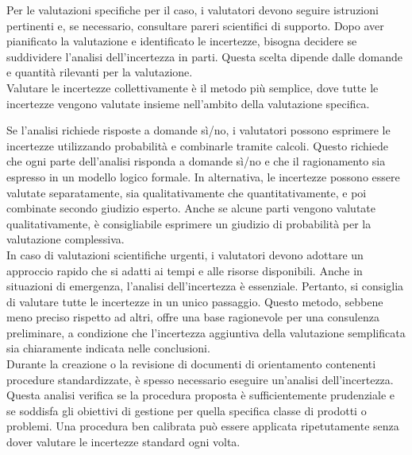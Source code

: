 
Per le valutazioni specifiche per il caso, i valutatori devono seguire istruzioni pertinenti e, se necessario, consultare pareri scientifici di supporto. Dopo aver pianificato la valutazione e identificato le incertezze, bisogna decidere se suddividere l'analisi dell'incertezza in parti. Questa scelta dipende dalle domande e quantità rilevanti per la valutazione. \\
Valutare le incertezze collettivamente è il metodo più semplice, dove tutte le incertezze vengono valutate insieme nell'ambito della valutazione specifica.

Se l'analisi richiede risposte a domande sì/no, i valutatori possono esprimere le incertezze utilizzando probabilità e combinarle tramite calcoli. Questo richiede che ogni parte dell'analisi risponda a domande sì/no e che il ragionamento sia espresso in un modello logico formale. In alternativa, le incertezze possono essere valutate separatamente, sia qualitativamente che quantitativamente, e poi combinate secondo giudizio esperto. Anche se alcune parti vengono valutate qualitativamente, è consigliabile esprimere un giudizio di probabilità per la valutazione complessiva.\\

In caso di valutazioni scientifiche urgenti, i valutatori devono adottare un approccio rapido che si adatti ai tempi e alle risorse disponibili. Anche in situazioni di emergenza, l'analisi dell'incertezza è essenziale. Pertanto, si consiglia di valutare tutte le incertezze in un unico passaggio. Questo metodo, sebbene meno preciso rispetto ad altri, offre una base ragionevole per una consulenza preliminare, a condizione che l'incertezza aggiuntiva della valutazione semplificata sia chiaramente indicata nelle conclusioni.\\

Durante la creazione o la revisione di documenti di orientamento contenenti procedure standardizzate, è spesso necessario eseguire un'analisi dell'incertezza. Questa analisi verifica se la procedura proposta è sufficientemente prudenziale e se soddisfa gli obiettivi di gestione per quella specifica classe di prodotti o problemi. Una procedura ben calibrata può essere applicata ripetutamente senza dover valutare le incertezze standard ogni volta.\\

